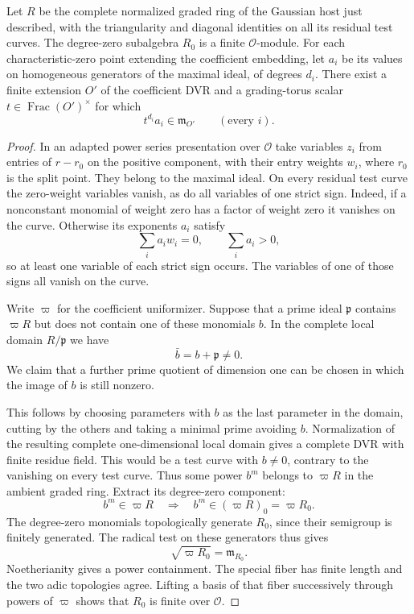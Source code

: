 \begin{proposition}\label{prop:marked-invariant-algebra}
Let \(R\) be the complete normalized graded ring of the
Gaussian host just described, with the triangularity and
diagonal identities on all its residual test curves.
The degree-zero subalgebra \(R_0\) is a finite \(\mathcal O\)-module.
For each characteristic-zero point extending the coefficient embedding,
let \(a_i\) be its values on homogeneous generators of the maximal ideal,
of degrees \(d_i\). There exist a finite extension \(O'\) of the coefficient DVR and a grading-torus scalar
\(t\in\operatorname{Frac}(O')^\times\) for which
\[
                  t^{d_i}a_i\in\mathfrak m_{O'}\qquad(\text{every }i).
\]
\end{proposition}

\begin{proof}
In an adapted power series
presentation over \(\mathcal O\) take variables \(z_i\) from
entries of \(r-r_0\) on the positive component, with their
entry weights \(w_i\), where \(r_0\) is the split point. They
belong to the maximal ideal. On every residual test curve
the zero-weight variables vanish, as do all variables of one
strict sign. Indeed, if a nonconstant monomial of weight zero has a factor of weight zero it vanishes on the curve. Otherwise its exponents \(a_i\) satisfy
\[
 \sum_i a_iw_i=0,\qquad \sum_i a_i>0 ,
\]
so at least one variable of each strict sign occurs. The variables of one of those signs all vanish on the curve.

Write \(\varpi\) for the coefficient uniformizer. Suppose that a prime ideal
\(\mathfrak p\) contains \(\varpi R\) but does not contain one of these
monomials \(b\). In the complete local domain \(R/\mathfrak p\) we have
\[
 \bar b=b+\mathfrak p\ne0 .
\]
We claim that a further prime
quotient of dimension one can be chosen in which the image of \(b\)
is still nonzero.

This follows by choosing parameters
with \(b\) as the last parameter in the domain, cutting by
the others and taking a minimal prime avoiding \(b\).
Normalization of the resulting complete one-dimensional
local domain gives a complete DVR with finite residue field.
This would be a test curve with \(b\ne0\), contrary to the vanishing on every test curve. Thus some power \(b^m\) belongs to \(\varpi R\) in the ambient graded ring. Extract its degree-zero component:
\[
 b^m\in\varpi R\quad\Longrightarrow\quad b^m\in(\varpi R)_0=\varpi R_0 .
\] The degree-zero monomials topologically generate \(R_0\), since their semigroup is finitely generated. The radical test on these generators thus gives
\[
 \sqrt{\varpi R_0}=\mathfrak m_{R_0}.
\] Noetherianity
gives a power containment. The special fiber has finite
length and the two adic topologies agree. Lifting a basis
of that fiber successively through powers of \(\varpi\)
shows that \(R_0\) is finite over \(\mathcal O\).


\end{proof}
